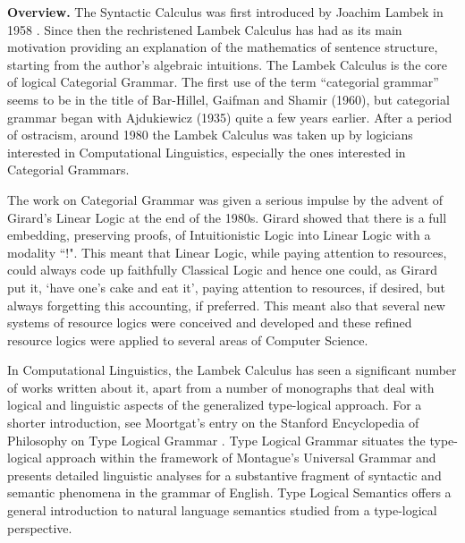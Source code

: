 \documentclass{llncs}
\begin{document}
\textbf{Overview.} The Syntactic Calculus was first introduced by
Joachim Lambek in 1958 \cite{Lambek1958}. Since then the rechristened
Lambek Calculus has had as its main motivation providing an
explanation of the mathematics of sentence structure, starting from
the author's algebraic intuitions. The Lambek Calculus is the core of
logical Categorial Grammar.  The first use of the term “categorial
grammar” seems to be in the title of Bar-Hillel, Gaifman and Shamir
(1960), but categorial grammar began with Ajdukiewicz (1935) quite a
few years earlier. After a period of ostracism, around 1980 the Lambek
Calculus was taken up by logicians interested in Computational
Linguistics, especially the ones interested in Categorial
Grammars. %

The work on Categorial Grammar was given a serious impulse by the
advent of Girard's Linear Logic at the end of the 1980s.  Girard
\cite{Girard:1987} showed that there is a full embedding, preserving
proofs, of Intuitionistic Logic into Linear Logic with a modality
``!". This meant that Linear Logic, while paying attention to
resources, could always code up faithfully Classical Logic and hence
one could, as Girard put it, `have one's cake and eat it', paying
attention to resources, if desired, but always forgetting this
accounting, if preferred. This meant also that several new systems of
resource logics were conceived and developed and these refined
resource logics were applied to several areas of Computer Science.

In Computational Linguistics, the Lambek Calculus has seen a
significant number of works written about it, apart from a number of
monographs that deal with logical and linguistic aspects of the
generalized type-logical approach.  For a shorter introduction, see
Moortgat's entry on the Stanford Encyclopedia of Philosophy on Type
Logical Grammar \cite{MoortgatSEP}.  Type Logical Grammar situates the
type-logical approach within the framework of Montague's Universal
Grammar and presents detailed linguistic analyses for a substantive
fragment of syntactic and semantic phenomena in the grammar of
English.  Type Logical Semantics offers a general introduction to
natural language semantics studied from a type-logical perspective.
\end{document}
